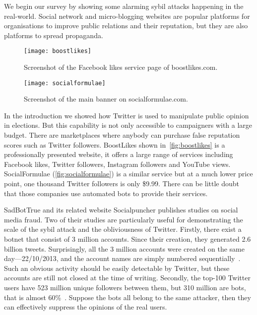 We begin our survey by showing some alarming sybil attacks happening in the
real-world. Social network and micro-blogging websites are popular platforms for
organisations to improve public relations and their reputation, but they are
also platforms to spread propaganda. 

\begin{figure}
  \centering
  \texttt{[image: boostlikes]}
  \caption{Screenshot of the Facebook likes service page of boostlikes.com.}
  \label{fig:boostlikes}
\end{figure}

\begin{figure*}
  \centering
  \texttt{[image: socialformulae]}
  \caption{Screenshot of the main banner on socialformulae.com.}
  \label{fig:socialformulae}
\end{figure*}

In the introduction we showed how Twitter is used to manipulate public opinion
in elections. But this capability is not only accessible to campaigners with a
large budget. There are marketplaces where anybody can purchase false reputation
scores such as Twitter followers. BoostLikes shown in~\autoref{fig:boostlikes}
is a professionally presented website, it offers a large range of services
including Facebook likes, Twitter followers, Instagram followers and YouTube
views. SocialFormulae (\autoref{fig:socialformulae}) is a similar service but at
a much lower price point, one thousand Twitter followers is only \$9.99. There
can be little doubt that those companies use automated bots to provide their
services.

SadBotTrue and its related website Socialpuncher publishes studies on social
media fraud. Two of their studies are particularly useful for demonstrating the
scale of the sybil attack and the obliviousness of Twitter. Firstly, there exist
a botnet that consist of 3 million accounts. Since their creation, they
generated 2.6 billion tweets. Surprisingly, all the 3 million accounts were
created on the same day---22/10/2013, and the account names are simply numbered
sequentially~\cite{sadbottrue}. Such an obvious activity should be easily
detectable by Twitter, but these accounts are still not closed at the time of
writing. Secondly, the top-100 Twitter users have 523 million unique followers
between them, but 310 million are bots, that is almost
60\%~\cite{socialpuncher}. Suppose the bots all belong to the same attacker,
then they can effectively suppress the opinions of the real users.

